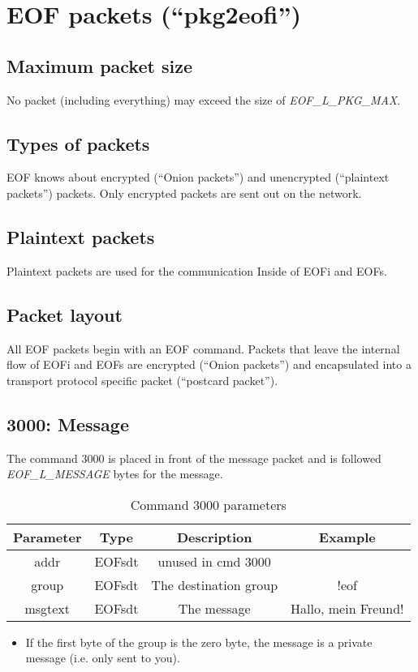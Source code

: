 \documentclass[12pt,a4paper]{book}
\begin{document}
\section{EOF packets ("`pkg2eofi"')}
\subsection{Maximum packet size}
No packet (including everything) may exceed the size of \emph{EOF\_L\_PKG\_MAX}.
\subsection{Types of packets}
EOF knows about encrypted ("`Onion packets"') and
unencrypted ("`plaintext packets"') packets.
Only encrypted packets are sent out on the network.
\subsection{Plaintext packets}
Plaintext packets are used for the communication Inside of EOFi and EOFs.
\subsection{Packet layout}
All EOF packets begin with an EOF command. Packets that leave the internal
flow of EOFi and EOFs are encrypted ("`Onion packets"') and encapsulated into
a transport protocol specific packet ("`postcard packet"').
\subsection{3000: Message}
The command 3000 is placed in front of the message packet and is
followed \emph{EOF\_L\_MESSAGE} bytes for the message.
%
\begin{longtable}{|c|c|c|c|}
\caption{Command 3000 parameters}\\
\hline
\textbf{Parameter} & \textbf{Type} & \textbf{Description} & \textbf{Example}\\
\hline
addr & EOFsdt & unused in cmd 3000 &\\
\hline
group & EOFsdt & The destination group & !eof\\
\hline
msgtext & EOFsdt & The message & Hallo, mein Freund!\\
\hline
\end{longtable}
\begin{itemize}
\item If the first byte of the group is the zero byte, the message
is a private message (i.e. only sent to you).
\end{itemize}
\end{document}
